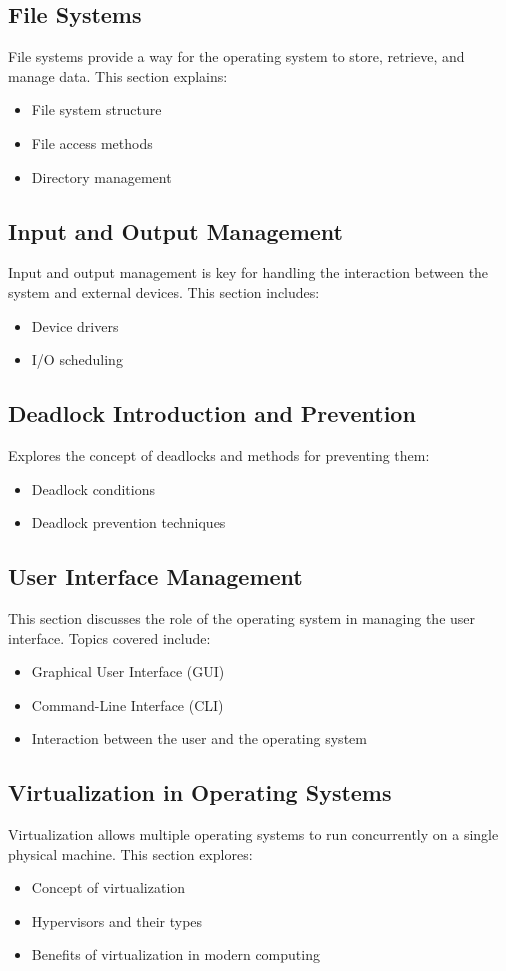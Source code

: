 \documentclass[12pt]{article}
\begin{document}
\subsection{File Systems}
File systems provide a way for the operating system to store, retrieve, and manage data. This section explains:
\begin{itemize}
    \item File system structure
    \item File access methods
    \item Directory management
\end{itemize}

\subsection{Input and Output Management}
Input and output management is key for handling the interaction between the system and external devices. This section includes:
\begin{itemize}
    \item Device drivers
    \item I/O scheduling
\end{itemize}

\subsection{Deadlock Introduction and Prevention}
Explores the concept of deadlocks and methods for preventing them:
\begin{itemize}
    \item Deadlock conditions
    \item Deadlock prevention techniques
\end{itemize}

\subsection{User Interface Management}
This section discusses the role of the operating system in managing the user interface. Topics covered include:
\begin{itemize}
    \item Graphical User Interface (GUI)
    \item Command-Line Interface (CLI)
    \item Interaction between the user and the operating system
\end{itemize}

\subsection{Virtualization in Operating Systems}
Virtualization allows multiple operating systems to run concurrently on a single physical machine. This section explores:
\begin{itemize}
    \item Concept of virtualization
    \item Hypervisors and their types
    \item Benefits of virtualization in modern computing
\end{itemize}
\end{document}
